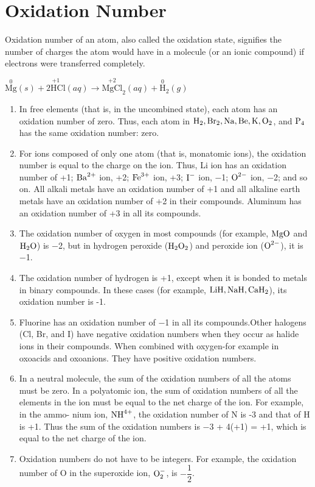 \documentclass[a4paper,12pt,twocolumn]{article}
\begin{document}
\section{Oxidation Number}
Oxidation number of an atom, also called the oxidation state, signifies the number of charges the atom would have in a molecule (or an ionic compound) if electrons were transferred completely.
\begin{center}
$\stackrel{0}{\mathrm{Mg}}(s)+\stackrel{+1}{2 \mathrm{HCl}}(a q) \longrightarrow  \stackrel{+2}{\mathrm{MgCl}}_{2}(a q)+\stackrel{0}{\mathrm{H}}_{2}(g)$
\end{center}
\begin{enumerate}
\item In free elements (that is, in the uncombined state), each atom has an oxidation number of zero. Thus, each atom in $\ce{H2, Br2, Na, Be, K, O2}$, and $\ce{P4}$ has the same oxidation number: zero.
\item For ions composed of only one atom (that is, monatomic ions), the oxidation number is equal to the charge on the ion. Thus, Li ion has an oxidation number of +1; $\ce{Ba^{2+}}$ ion, +2; $\ce{Fe^{3+}}$ ion, +3; $\ce{I^{-}}$ ion, −1; $\ce{O^{2-}}$ ion, −2; and so on. All alkali metals have an oxidation number of +1 and all alkaline earth metals have an oxidation number of +2 in their compounds. Aluminum has an oxidation number of +3 in all its compounds.
\item The oxidation number of oxygen in most compounds (for example, $\ce{MgO}$ and $\ce{H2O}$) is −2, but in hydrogen peroxide ($\ce{H2O2}$) and peroxide ion ($\ce{O^{2-}}$), it is −1.
\item The oxidation number of hydrogen is +1, except when it is bonded to metals in binary compounds. In these cases (for example, $\ce{LiH, NaH, CaH2}$), its oxidation number is -1.
\item Fluorine has an oxidation number of −1 in all its compounds.Other halogens (Cl, Br, and I) have negative oxidation numbers when they occur as halide ions in their compounds. When combined with oxygen-for example in oxoacids and oxoanions. They have positive oxidation numbers.
\item In a neutral molecule, the sum of the oxidation numbers of all the atoms must be zero. In a polyatomic ion, the sum of oxidation numbers of all the elements in the ion must be equal to the net charge of the ion. For example, in the ammo- nium ion, $\ce{NH^{4+}}$, the oxidation number of N is -3 and that of H is +1. Thus the sum of the oxidation numbers is −3 + 4(+1) = +1, which is equal to the net charge of the ion.
\item Oxidation numbers do not have to be integers. For example, the oxidation number of O in the superoxide ion, $\ce{O^{-}2}$, is $-\dfrac{1}{2}$.
\end{enumerate}
\end{document}
